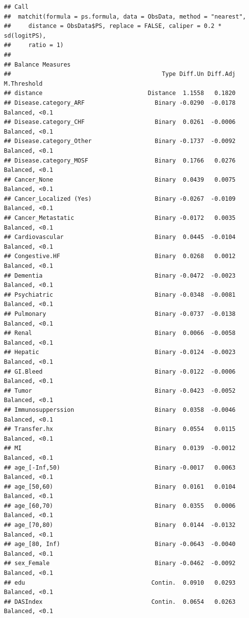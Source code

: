 \documentclass[
]{book}
\begin{document}
\begin{verbatim}
## Call
##  matchit(formula = ps.formula, data = ObsData, method = "nearest", 
##     distance = ObsData$PS, replace = FALSE, caliper = 0.2 * sd(logitPS), 
##     ratio = 1)
## 
## Balance Measures
##                                           Type Diff.Un Diff.Adj    M.Threshold
## distance                              Distance  1.1558   0.1820               
## Disease.category_ARF                    Binary -0.0290  -0.0178 Balanced, <0.1
## Disease.category_CHF                    Binary  0.0261  -0.0006 Balanced, <0.1
## Disease.category_Other                  Binary -0.1737  -0.0092 Balanced, <0.1
## Disease.category_MOSF                   Binary  0.1766   0.0276 Balanced, <0.1
## Cancer_None                             Binary  0.0439   0.0075 Balanced, <0.1
## Cancer_Localized (Yes)                  Binary -0.0267  -0.0109 Balanced, <0.1
## Cancer_Metastatic                       Binary -0.0172   0.0035 Balanced, <0.1
## Cardiovascular                          Binary  0.0445  -0.0104 Balanced, <0.1
## Congestive.HF                           Binary  0.0268   0.0012 Balanced, <0.1
## Dementia                                Binary -0.0472  -0.0023 Balanced, <0.1
## Psychiatric                             Binary -0.0348  -0.0081 Balanced, <0.1
## Pulmonary                               Binary -0.0737  -0.0138 Balanced, <0.1
## Renal                                   Binary  0.0066  -0.0058 Balanced, <0.1
## Hepatic                                 Binary -0.0124  -0.0023 Balanced, <0.1
## GI.Bleed                                Binary -0.0122  -0.0006 Balanced, <0.1
## Tumor                                   Binary -0.0423  -0.0052 Balanced, <0.1
## Immunosupperssion                       Binary  0.0358  -0.0046 Balanced, <0.1
## Transfer.hx                             Binary  0.0554   0.0115 Balanced, <0.1
## MI                                      Binary  0.0139  -0.0012 Balanced, <0.1
## age_[-Inf,50)                           Binary -0.0017   0.0063 Balanced, <0.1
## age_[50,60)                             Binary  0.0161   0.0104 Balanced, <0.1
## age_[60,70)                             Binary  0.0355   0.0006 Balanced, <0.1
## age_[70,80)                             Binary  0.0144  -0.0132 Balanced, <0.1
## age_[80, Inf)                           Binary -0.0643  -0.0040 Balanced, <0.1
## sex_Female                              Binary -0.0462  -0.0092 Balanced, <0.1
## edu                                    Contin.  0.0910   0.0293 Balanced, <0.1
## DASIndex                               Contin.  0.0654   0.0263 Balanced, <0.1

\end{verbatim}
\end{document}
